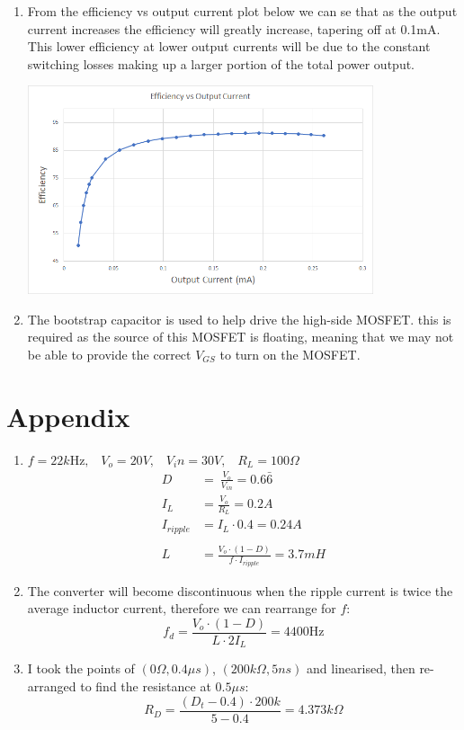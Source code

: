 \documentclass[a4paper,11pt]{article}
\begin{document}
\begin{preview}
\begin{enumerate}
    \item 

    From the efficiency vs output current plot below we can se that as the output current increases the efficiency will greatly increase, tapering off at 0.1mA. This lower efficiency at lower output currents will be due to the constant switching losses making up a larger portion of the total power output.

    \begin{center}
      \includegraphics[width=0.8\textwidth]{effeciency.png}  
    \end{center}

    \item The bootstrap capacitor is used to help drive the high-side MOSFET. this is required as the source of this MOSFET is floating, meaning that we may not be able to provide the correct $V_{GS}$ to turn on the MOSFET. 

\end{enumerate}

\section*{Appendix}

\begin{enumerate}
  \item $ f = 22k\mathrm{Hz}, \;\;\; V_o = 20V, \;\;\; V_in=30V, \;\;\; R_L=100\Omega $
  \begin{align*}
    D\ &=\ \frac{V_{o}}{V_{in}} = 0.6\bar{6}\\
    I_{L}&=\frac{V_{o}}{R_{L}} = 0.2A\\
    I_{ripple}&=I_{L}\cdot0.4 = 0.24A\\\\
    L&=\frac{V_{o}\cdot\left(1-D\right)}{f\cdot I_{ripple}} = 3.7mH
  \end{align*}

  \item The converter will become discontinuous when the ripple current is twice the average inductor current, therefore we can rearrange for $f$:
  $$ f_{d}=\frac{V_{o}\cdot\left(1-D\right)}{L\cdot2I_{L}} = 4400\mathrm{Hz}$$

  \item I took the points of $(0\Omega , 0.4\mu s)$, $(200k\Omega , 5ns)$ and linearised, then re-arranged to find the resistance at $0.5\mu s$:
  $$ R_{D}=\frac{\left(D_{t}-0.4\right)\cdot200k}{5-0.4} = 4.373k\Omega$$
\end{enumerate}


\end{preview}
\end{document}
